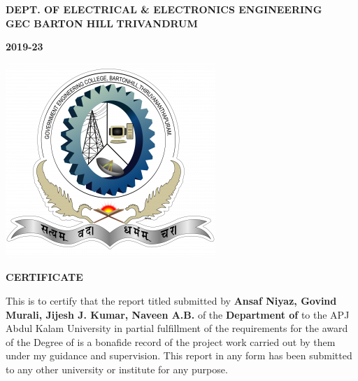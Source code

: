 \thispagestyle{plain}
\newpage
\begin{center}  
  
  \textbf{DEPT. OF ELECTRICAL \& ELECTRONICS  ENGINEERING}
  \\  
  \textbf{GEC BARTON HILL}  
  \textbf{TRIVANDRUM}
  
  \textbf{2019-23} 
\end{center}

\begin{center}
  \includegraphics[scale=0.5]{logo.png}  
\end{center}
\begin{center}
  \textbf{CERTIFICATE}
\end{center}

\noindent 

This is to certify that the report titled {\bf \ReportTitle}submitted by {\bf Ansaf Niyaz, Govind Murali, Jijesh J. Kumar, Naveen A.B.} of the {\bf Department of \Department} to the APJ Abdul Kalam
University in partial fulfillment of the requirements for the award of the Degree of \emph{\Degree} is a bonafide record of the project work
carried out by them under my guidance and supervision. This report in any form has been
submitted
to
any
other
university
or
institute
for
any
purpose.

